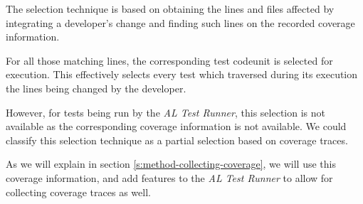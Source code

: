 The selection technique is based on obtaining the lines and files affected
by integrating a developer's change and finding such lines on the recorded coverage information.

For all those matching lines, the corresponding test codeunit is selected for execution. This 
effectively selects every test which traversed during its execution the lines being changed
by the developer.

However, for tests being run by the \emph{AL Test Runner}, this selection is not available as the corresponding 
coverage information is not available. We could classify this selection technique as a partial selection
based on coverage traces.

As we will explain in section \ref{s:method-collecting-coverage}, we will use this coverage 
information, and add features to the \emph{AL Test Runner} to allow for collecting coverage
traces as well.